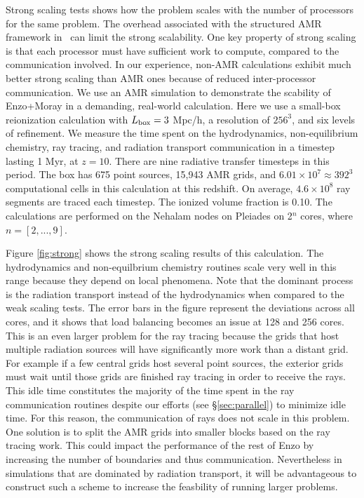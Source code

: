 \documentclass[apj,onecolumn]{emulateapj}
\begin{document}
Strong scaling tests shows how the problem scales with the number of
processors for the same problem.  The overhead associated with the
structured AMR framework in \enzo~can limit the strong scalability.
One key property of strong scaling is that each processor must have
sufficient work to compute, compared to the communication involved.
In our experience, non-AMR calculations exhibit much better strong
scaling than AMR ones because of reduced inter-processor
communication.  We use an AMR simulation to demonstrate the scability
of Enzo+Moray in a demanding, real-world calculation.  Here we use a
small-box reionization calculation with $L_{\rm box} = 3$ Mpc/h, a
resolution of $256^3$, and six levels of refinement.  We measure the
time spent on the hydrodynamics, non-equilibrium chemistry, ray
tracing, and radiation transport communication in a timestep lasting 1
Myr, at $z=10$.  There are nine radiative transfer timesteps in this
period.  The box has 675 point sources, 15,943 AMR grids, and $6.01
\times 10^7 \approx 392^3$ computational cells in this calculation at
this redshift.  On average, $4.6 \times 10^8$ ray segments are traced
each timestep.  The ionized volume fraction is 0.10.  The calculations
are performed on the Nehalam nodes on Pleiades on 2$^n$ cores, where
$n = [2,...,9]$.

Figure \ref{fig:strong} shows the strong scaling results of this
calculation.  The hydrodynamics and non-equilbrium chemistry routines
scale very well in this range because they depend on local phenomena.
Note that the dominant process is the radiation transport instead of
the hydrodynamics when compared to the weak scaling tests.  The error
bars in the figure represent the deviations across all cores, and it
shows that load balancing becomes an issue at 128 and 256 cores.  This
is an even larger problem for the ray tracing because the grids that
host multiple radiation sources will have significantly more work than
a distant grid.  For example if a few central grids host several point
sources, the exterior grids must wait until those grids are finished
ray tracing in order to receive the rays.  This idle time constitutes
the majority of the time spent in the ray communication routines
despite our efforts (see \S\ref{sec:parallel}) to minimize idle time.
For this reason, the communication of rays does not scale in this
problem.  One solution is to split the AMR grids into smaller blocks
based on the ray tracing work.  This could impact the performance of
the rest of Enzo by increasing the number of boundaries and thus
communication.  Nevertheless in simulations that are dominated by
radiation transport, it will be advantageous to construct such a
scheme to increase the feasbility of running larger problems.
\end{document}
